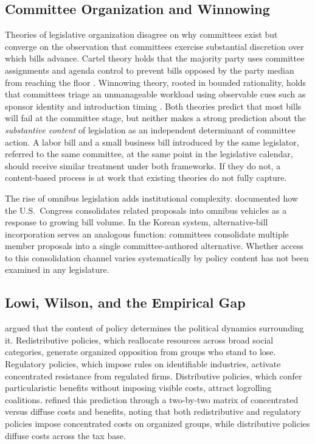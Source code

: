 \documentclass[11pt]{article}
\begin{document}
\subsection{Committee Organization and Winnowing}

Theories of legislative organization disagree on why committees exist but converge on the observation that committees exercise substantial discretion over which bills advance. Cartel theory holds that the majority party uses committee assignments and agenda control to prevent bills opposed by the party median from reaching the floor \citep{cox2005}. Winnowing theory, rooted in bounded rationality, holds that committees triage an unmanageable workload using observable cues such as sponsor identity and introduction timing \citep{krutz2005}. Both theories predict that most bills will fail at the committee stage, but neither makes a strong prediction about the \emph{substantive content} of legislation as an independent determinant of committee action. A labor bill and a small business bill introduced by the same legislator, referred to the same committee, at the same point in the legislative calendar, should receive similar treatment under both frameworks. If they do not, a content-based process is at work that existing theories do not fully capture.

The rise of omnibus legislation adds institutional complexity. \citet{krutz2005} documented how the U.S.\ Congress consolidates related proposals into omnibus vehicles as a response to growing bill volume. In the Korean system, alternative-bill incorporation serves an analogous function: committees consolidate multiple member proposals into a single committee-authored alternative. Whether access to this consolidation channel varies systematically by policy content has not been examined in any legislature.

\subsection{Lowi, Wilson, and the Empirical Gap}

\citet{lowi1964} argued that the content of policy determines the political dynamics surrounding it. Redistributive policies, which reallocate resources across broad social categories, generate organized opposition from groups who stand to lose. Regulatory policies, which impose rules on identifiable industries, activate concentrated resistance from regulated firms. Distributive policies, which confer particularistic benefits without imposing visible costs, attract logrolling coalitions. \citet{wilson1980} refined this prediction through a two-by-two matrix of concentrated versus diffuse costs and benefits, noting that both redistributive and regulatory policies impose concentrated costs on organized groups, while distributive policies diffuse costs across the tax base.
\end{document}
